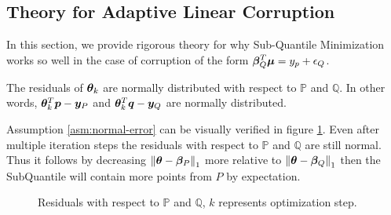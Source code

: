 \documentclass{article} %
\newcommand{\norm}[1]{\left\lVert#1\right\rVert}
\begin{document}
\begin{appendices}
	\section{Theory for Adaptive Linear Corruption}
	In this section, we provide rigorous theory for why Sub-Quantile Minimization works so well in the case of corruption of the form $\displaystyle {\bm{\beta}}_Q^T {\bm{\mu}} = y_p + {\epsilon}_Q$.
	\begin{assumption}\label{asm:normal-error}
		The residuals of ${\bm{\theta}}_k$ are normally distributed with respect to $\mathbb{P}$ and $\mathbb{Q}$. In other words, ${\bm{\theta}}_k^T {\bm{p}} - {\bm{y}}_P$ and ${\bm{\theta}}_k^T {\bm{q}} - {\bm{y}}_Q$ are normally distributed.
	\end{assumption}
	Assumption \ref{asm:normal-error} can be visually verified in figure \ref{fig:normal-residual}. Even after multiple iteration steps the residuals with respect to $\mathbb{P}$ and $\mathbb{Q}$ are still normal. Thus it follows by decreasing $\norm{\vtheta - \vbeta_P}_1$ more relative to $\norm{\vtheta - \vbeta_Q}_1$ then the SubQuantile will contain more points from $P$ by expectation. 
	\begin{figure}
		\begin{minipage}[htbp]{0.24\textwidth}
			\centering
			
			\label{fig:1}
		\end{minipage}
		\hfill
		\begin{minipage}[htbp]{0.24\textwidth}
			\centering
			
			\label{fig:2}
		\end{minipage}
		\hfill
		\begin{minipage}[htbp]{0.24\textwidth}
			\centering
			
			\label{fig:3}
		\end{minipage}
		\hfill
		\begin{minipage}[htbp]{0.24\textwidth}
			\centering
			
			\label{fig:4}
		\end{minipage}
		\caption{Residuals with respect to $\mathbb{P}$ and $\mathbb{Q}$, $k$ represents optimization step.}
		\label{fig:normal-residual}
	\end{figure}


\end{appendices}
\end{document}
